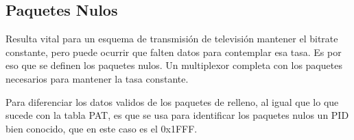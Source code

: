 	
	\subsection{Paquetes Nulos}
	
	Resulta vital para un esquema de transmisión de televisión mantener el bitrate constante, pero puede ocurrir que falten datos para contemplar esa tasa. Es por eso que se definen los paquetes nulos. Un multiplexor completa con los paquetes necesarios para mantener la tasa constante.
	
	Para diferenciar los datos validos de los paquetes de relleno, al igual que lo que sucede con la tabla PAT, es que se usa para identificar los paquetes nulos un PID bien conocido, que en este caso es el 0x1FFF.

